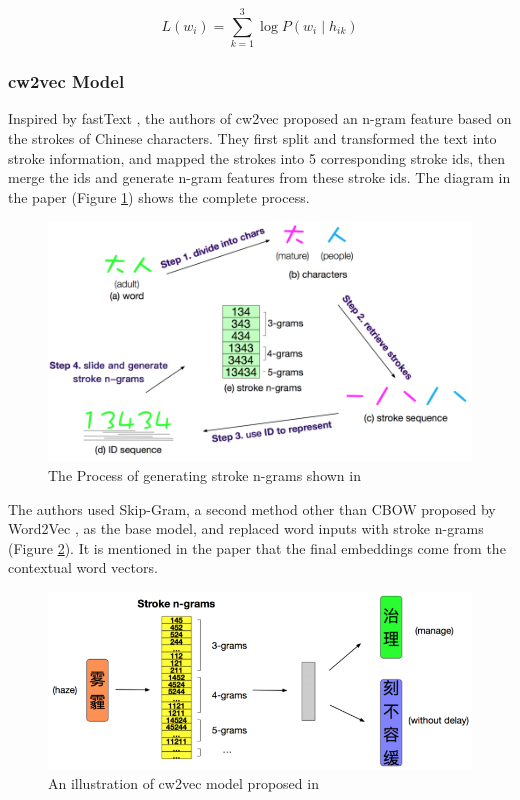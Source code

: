 \begin{equation}
L(w_i) = \sum_{k=1}^3\log P(w_i\mid h_{ik})    
\end{equation}

\subsubsection{cw2vec Model}

Inspired by fastText \cite{bojanowski2017enriching}, the authors of cw2vec \cite{cao2018cw2vec} proposed an n-gram feature based on the strokes of Chinese characters. They first split and transformed the text into stroke information, and mapped the strokes into 5 corresponding stroke ids, then merge the ids and generate n-gram features from these stroke ids. The diagram in the paper (Figure \ref{fig:cw2vec1}) shows the complete process.

\begin{figure}[h]
	\centering
	\includegraphics[scale=0.6]{../images/cw2vec_illustration1.png}
	\caption{The Process of generating stroke n-grams shown in \cite{cao2018cw2vec}}
	\label{fig:cw2vec1}
\end{figure}

The authors used Skip-Gram, a second method other than CBOW proposed by Word2Vec \cite{mikolov2013efficient}, as the base model, and replaced word inputs with stroke n-grams (Figure \ref{fig:cw2vec2}). It is mentioned in the paper that the final embeddings come from the contextual word vectors.

\begin{figure}[h]
	\centering
	\includegraphics[scale=0.6]{../images/cw2vec_illustration2.png}
	\caption{An illustration of cw2vec model proposed in \cite{cao2018cw2vec}}
	\label{fig:cw2vec2}
\end{figure}

